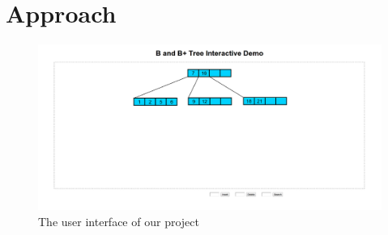 \section{Approach}

\begin{figure}[htp]
\centering
\includegraphics[scale=0.25]{images/Interface.png}
\caption{The user interface of our project}
\label{UI}
\end{figure}

